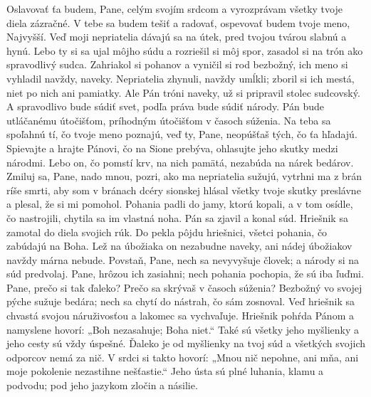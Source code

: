 Oslavovať ťa budem, Pane, celým svojím srdcom
a vyrozprávam všetky tvoje diela zázračné.
\versseparator
V tebe sa budem tešiť a radovať,
ospevovať budem tvoje meno, Najvyšší.
\versseparator
Veď moji nepriatelia dávajú sa na útek,
pred tvojou tvárou slabnú a hynú.
\versseparator
Lebo ty si sa ujal môjho súdu a rozriešil si môj spor,
zasadol si na trón ako spravodlivý sudca.
\versseparator
Zahriakol si pohanov a vyničil si rod bezbožný,
ich meno si vyhladil navždy, naveky.
\versseparator
Nepriatelia zhynuli, navždy umĺkli;
zboril si ich mestá, niet po nich ani pamiatky.
\versseparator
Ale Pán tróni naveky,
už si pripravil stolec sudcovský.
\versseparator
A spravodlivo bude súdiť svet,
podľa práva bude súdiť národy.
\versseparator
Pán bude utláčanému útočišťom,
príhodným útočišťom v časoch súženia.
\versseparator
Na teba sa spoľahnú tí, čo tvoje meno poznajú,
veď ty, Pane, neopúšťaš tých, čo ťa hľadajú.
\versseparator
Spievajte a hrajte Pánovi, čo na Sione prebýva,
ohlasujte jeho skutky medzi národmi.
\versseparator
Lebo on, čo pomstí krv, na nich pamätá,
nezabúda na nárek bedárov.
\versseparator
Zmiluj sa, Pane, nado mnou,
pozri, ako ma nepriatelia sužujú,
\versseparator
vytrhni ma z brán ríše smrti,
aby som v bránach dcéry sionskej hlásal všetky tvoje skutky preslávne
\versseparator
a plesal, že si mi pomohol.
Pohania padli do jamy, ktorú kopali,
\versseparator
a v tom osídle, čo nastrojili,
chytila sa im vlastná noha.
\versseparator
Pán sa zjavil a konal súd.
Hriešnik sa zamotal do diela svojich rúk.
\versseparator
Do pekla pôjdu hriešnici,
všetci pohania, čo zabúdajú na Boha.
\versseparator
Lež na úbožiaka on nezabudne naveky,
ani nádej úbožiakov navždy márna nebude.
\versseparator
Povstaň, Pane, nech sa nevyvyšuje človek;
a národy si na súd predvolaj.
\versseparator
Pane, hrôzou ich zasiahni;
nech pohania pochopia, že sú iba ľuďmi. 
\versseparator
Pane, prečo si tak ďaleko?
Prečo sa skrývaš v časoch súženia?
\versseparator
Bezbožný vo svojej pýche sužuje bedára;
nech sa chytí do nástrah, čo sám zosnoval.
\versseparator
Veď hriešnik sa chvastá svojou náruživosťou
a lakomec sa vychvaľuje.
\versseparator
Hriešnik pohŕda Pánom a namyslene hovorí:
\versseparator
„Boh nezasahuje; Boha niet.“
Také sú všetky jeho myšlienky
a jeho cesty sú vždy úspešné.
\versseparator
Ďaleko je od myšlienky na tvoj súd
a všetkých svojich odporcov nemá za nič.
\versseparator
V srdci si takto hovorí: „Mnou nič nepohne,
ani mňa, ani moje pokolenie nezastihne nešťastie.“
\versseparator
Jeho ústa sú plné luhania, klamu a podvodu;
pod jeho jazykom zločin a násilie.
\versseparator
